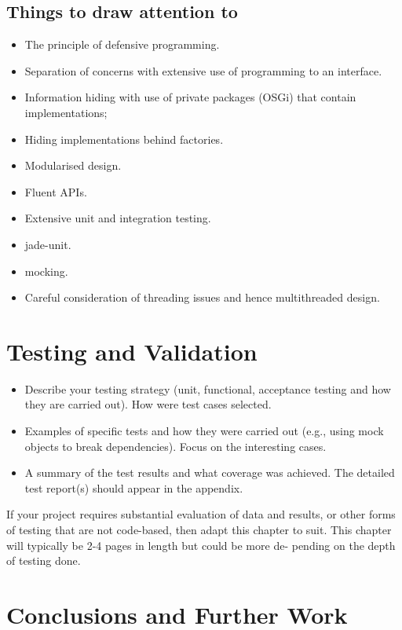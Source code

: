 \documentclass[ openright,titlepage,numbers=noenddot,headinclude,%
                footinclude=true,BCOR=5mm,paper=a4,fontsize=12pt,a4paper,english%
                ]{scrreprt}
\begin{document}
\section{Things to draw attention to}
\begin{itemize}
\item The principle of defensive programming.
\item Separation of concerns with extensive use of programming to an interface.
\item Information hiding with use of private packages (OSGi) that contain implementations;
\item Hiding implementations behind factories.
\item Modularised design.
\item Fluent APIs.
\item Extensive unit and integration testing.
\item jade-unit.
\item mocking.
\item Careful consideration of threading issues and hence multithreaded design.

\end{itemize}


\chapter{Testing and Validation}
\label{Chapters/Testing-and-Validation}

\begin{itemize}
\item Describe your testing strategy (unit, functional, acceptance testing
and how they are carried out). How were test cases selected.
\item Examples of specific tests and how they were carried out (e.g., using mock objects to break dependencies). Focus on the interesting cases.
\item A summary of the test results and what coverage was achieved. The detailed test report(s) should appear in the appendix.
\end{itemize}

If your project requires substantial evaluation of data and results, or other forms of testing that are not code-based, then adapt this chapter to suit.
This chapter will typically be 2-4 pages in length but could be more de- pending on the depth of testing done.

\chapter{Conclusions and Further Work}
\label{Chapters/Conclusion-and-Further-Work}
\end{document}
